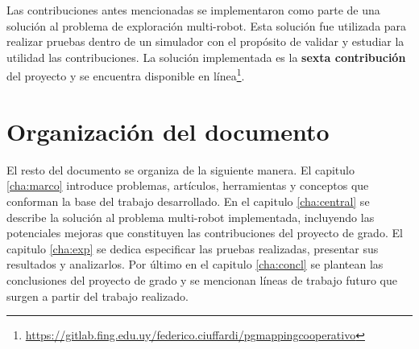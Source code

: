 



Las contribuciones antes mencionadas se implementaron como parte de una
solución al problema de exploración multi-robot. Esta solución fue utilizada para
realizar pruebas dentro de un simulador con el propósito de validar y estudiar
la utilidad las contribuciones. La solución implementada es la \textbf{sexta
contribución} del proyecto y se encuentra disponible en
línea\footnote{\url{https://gitlab.fing.edu.uy/federico.ciuffardi/pgmappingcooperativo}}.

\section{Organización del documento}
El resto del documento se organiza de la siguiente manera. El capitulo
\ref{cha:marco} introduce problemas, artículos, herramientas y conceptos que
conforman la base del trabajo desarrollado. En el capitulo \ref{cha:central} se
describe la solución al problema multi-robot implementada, incluyendo las
potenciales mejoras que constituyen las contribuciones del proyecto de grado. El
capitulo \ref{cha:exp} se dedica especificar las pruebas realizadas, presentar
sus resultados y analizarlos. Por último en el capitulo \ref{cha:concl} se
plantean las conclusiones del proyecto de grado y se mencionan líneas de
trabajo futuro que surgen a partir del trabajo realizado.


